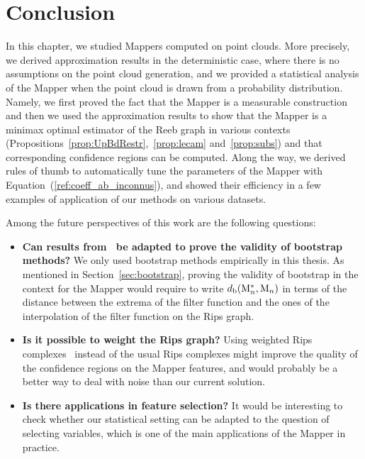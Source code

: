 \section{Conclusion}


In this chapter, we studied Mappers computed on point clouds. More precisely, we derived approximation results in the deterministic case,
where there is no assumptions on the point cloud generation, and we provided
a statistical analysis of the Mapper when the point cloud is drawn from a probability distribution. 
Namely, we first proved the fact that the Mapper is
a measurable construction %
and then we used the approximation results %
to show that the Mapper is a minimax optimal 
estimator of the Reeb graph in various contexts (Propositions~\ref{prop:UpBdRestr},~\ref{prop:lecam} and~\ref{prop:subs})
and that corresponding confidence regions can be computed. %
Along the way, we derived rules of thumb to automatically tune the parameters of the Mapper with Equation~(\ref{ref:coeff_ab_inconnus}), and 
showed their efficiency in a few examples of application of our methods on various datasets. %

Among the future perspectives of this work are the following questions:

\begin{itemize}

\item {\bf Can results from~\cite{Chazal14b} be adapted to  
prove the validity of bootstrap methods?} 
We only used bootstrap methods empirically in this thesis.
As mentioned in Section~\ref{sec:bootstrap}, proving the validity of 
bootstrap in the context for the Mapper 
would require to write  
$d_{\rm b} ( \mathrm{M}_n^*, \mathrm{M}_n)$ in terms of the distance between the extrema of the filter function and 
the ones of the interpolation of the filter function on the Rips graph.

\item {\bf Is it possible to weight the Rips graph?}
Using weighted Rips complexes~\cite{Buchet15} instead of the usual Rips complexes might
improve the quality of the confidence regions on the Mapper features,
and would probably be a better way to deal with noise than our current solution.

\item {\bf Is there applications in feature selection?}
It would be interesting to check whether  our statistical setting can be adapted to the question of selecting variables,
which is one of the main applications of the Mapper in practice.

\end{itemize}

%
%
